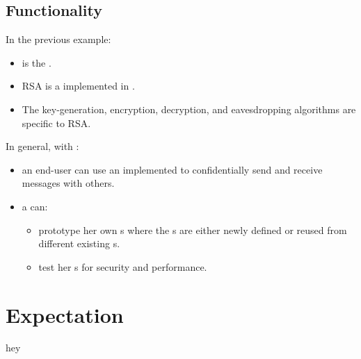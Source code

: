 \documentclass[11pt]{extarticle}
\begin{document}
\begin{flushleft}

\subsection{Functionality}

In the previous example:
\begin{itemize}
\item
  \cry{} is the \cf.
\item
  RSA is a \cs{} implemented in \cry.
\item
  The key-generation, encryption, decryption,
  and eavesdropping algorithms are specific to RSA.
\end{itemize}

In general, with \cry:
\begin{itemize}
\item an end-user can use an implemented \cs{}
  to confidentially send and receive messages with others.
\item a \cg{} can:
  \begin{itemize}
  \item prototype her own \cs s
    where the \ca s are either newly defined
    or reused from different existing \cs s.
  \item test her \cs s for security and performance.
  \end{itemize}
\end{itemize}


\section{Expectation}

hey


\end{flushleft}
\end{document}
